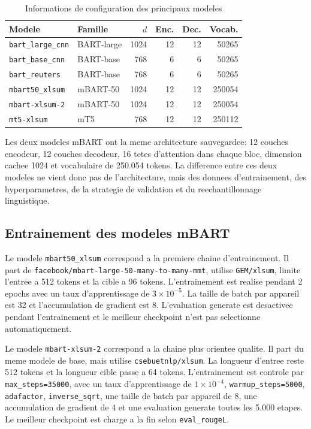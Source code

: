 \begin{table}[t]
\caption{Informations de configuration des principaux modeles}
\label{tab:model-configs}
\centering
\begin{tabular}{|p{3.1cm}|p{2.5cm}|r|r|r|r|}
\hline
\textbf{Modele} & \textbf{Famille} & \textbf{$d$} & \textbf{Enc.} & \textbf{Dec.} & \textbf{Vocab.} \\
\hline
\texttt{bart\_large\_cnn} & BART-large & 1024 & 12 & 12 & 50265 \\
\hline
\texttt{bart\_base\_cnn} & BART-base & 768 & 6 & 6 & 50265 \\
\hline
\texttt{bart\_reuters} & BART-base & 768 & 6 & 6 & 50265 \\
\hline
\texttt{mbart50\_xlsum} & mBART-50 & 1024 & 12 & 12 & 250054 \\
\hline
\texttt{mbart-xlsum-2} & mBART-50 & 1024 & 12 & 12 & 250054 \\
\hline
\texttt{mt5-xlsum} & mT5 & 768 & 12 & 12 & 250112 \\
\hline
\end{tabular}
\end{table}

Les deux modeles mBART ont la meme architecture sauvegardee: 12 couches encodeur, 12 couches decodeur, 16 tetes d'attention dans chaque bloc, dimension cachee 1024 et vocabulaire de 250.054 tokens. La difference entre ces deux modeles ne vient donc pas de l'architecture, mais des donnees d'entrainement, des hyperparametres, de la strategie de validation et du reechantillonnage linguistique.

\subsection{Entrainement des modeles mBART}

Le modele \texttt{mbart50\_xlsum} correspond a la premiere chaine d'entrainement. Il part de \texttt{facebook/mbart-large-50-many-to-many-mmt}, utilise \texttt{GEM/xlsum}, limite l'entree a 512 tokens et la cible a 96 tokens. L'entrainement est realise pendant 2 epochs avec un taux d'apprentissage de $3 \times 10^{-5}$. La taille de batch par appareil est 32 et l'accumulation de gradient est 8. L'evaluation generate est desactivee pendant l'entrainement et le meilleur checkpoint n'est pas selectionne automatiquement.

Le modele \texttt{mbart-xlsum-2} correspond a la chaine plus orientee qualite. Il part du meme modele de base, mais utilise \texttt{csebuetnlp/xlsum}. La longueur d'entree reste 512 tokens et la longueur cible passe a 64 tokens. L'entrainement est controle par \texttt{max\_steps=35000}, avec un taux d'apprentissage de $1 \times 10^{-4}$, \texttt{warmup\_steps=5000}, \texttt{adafactor}, \texttt{inverse\_sqrt}, une taille de batch par appareil de 8, une accumulation de gradient de 4 et une evaluation generate toutes les 5.000 etapes. Le meilleur checkpoint est charge a la fin selon \texttt{eval\_rougeL}.


